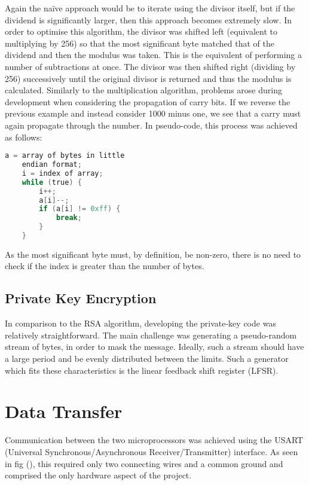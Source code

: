 \documentclass[a4paper,11pt,twocolumn]{article}
\begin{document}
	Again the na\"ive approach would be to iterate using the divisor itself, but if the dividend is significantly larger, then this approach becomes extremely slow. In order to optimise this algorithm, the divisor was shifted left (equivalent to multiplying by 256) so that the most significant byte matched that of the dividend and then the modulus was taken. This is the equivalent of performing a number of subtractions at once. The divisor was then shifted right (dividing by 256) successively until the original divisor is returned and thus the modulus is calculated. Similarly to the multiplication algorithm, problems arose during development when considering the propagation of carry bits. If we reverse the previous example and instead consider 1000 minus one, we see that a carry must again propagate through the number. In pseudo-code, this process was achieved as follows:
	\begin{lstlisting}[language=C,autogobble=true]
	a = array of bytes in little
	endian format;
	i = index of array;
	while (true) {
		i++;
		a[i]--;
		if (a[i] != 0xff) {
			break;
		}
	}
	\end{lstlisting}
	
	As the most significant byte must, by definition, be non-zero, there is no need to check if the index is greater than the number of bytes.
	
	\subsection{Private Key Encryption}
	In comparison to the RSA algorithm, developing the private-key code was relatively straightforward. The main challenge was generating a pseudo-random stream of bytes, in order to mask the message. Ideally, such a stream should have a large period and be evenly distributed between the limits. Such a generator which fits these characteristics is the linear feedback shift register (LFSR). 
	
	\section{Data Transfer}
	Communication between the two microprocessors was achieved using the USART (Universal Synchronous/Asynchronous Receiver/Transmitter) interface. As seen in fig (), this required only two connecting wires and a common ground and comprised the only hardware aspect of the project.
	
\end{document}
